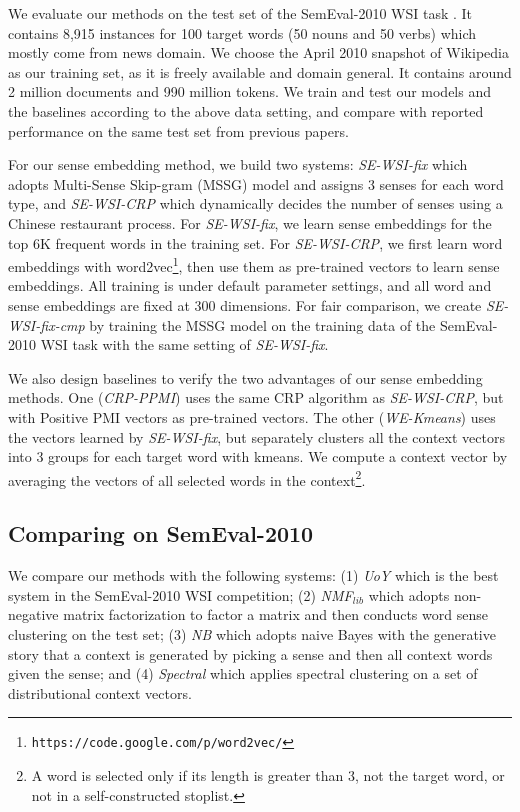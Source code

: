 \documentclass[11pt]{article}
\begin{document}
We evaluate our methods on the test set of the SemEval-2010 WSI task \cite{manandhar2010semeval}.
It contains 8,915 instances for 100 target words (50 nouns and 50 verbs) which mostly come from news domain.
We choose the April 2010 snapshot of Wikipedia \cite{wiki2010} as our training set, as it is freely available and domain general.
It contains around 2 million documents and 990 million tokens.
We train and test our models and the baselines according to the above data setting, and compare with reported performance on the same test set from previous papers.


For our sense embedding method, we build two systems: 
\emph{SE-WSI-fix} which adopts Multi-Sense Skip-gram (MSSG) model \cite{neelakantan-EtAl:2014:EMNLP2014} and assigns 3 senses for each word type,
and \emph{SE-WSI-CRP} \cite{li-jurafsky:2015:EMNLP} which dynamically decides the number of senses using a Chinese restaurant process.
For \emph{SE-WSI-fix}, we learn sense embeddings for the top 6K frequent words in the training set. For \emph{SE-WSI-CRP}, we first learn word embeddings with word2vec\footnote{\texttt{https://code.google.com/p/word2vec/}}, 
then use them as pre-trained vectors to learn sense embeddings.
All training is under default parameter settings, and all word and sense embeddings are fixed at 300 dimensions.
For fair comparison, we create \emph{SE-WSI-fix-cmp} by training the MSSG model on the training data of the SemEval-2010 WSI task with the same setting of \emph{SE-WSI-fix}.

We also design baselines to verify the two advantages of our sense embedding methods.
One (\emph{CRP-PPMI}) uses the same CRP algorithm as \emph{SE-WSI-CRP}, but with Positive PMI vectors as pre-trained vectors.
The other (\emph{WE-Kmeans}) uses the vectors learned by \emph{SE-WSI-fix}, but separately clusters all the context vectors into 3 groups for each target word with kmeans.
We compute a context vector by averaging the vectors of all selected words in the context\footnote{A word is selected only if its length is greater than 3, not the target word, or not in a self-constructed stoplist.}.

\subsection{Comparing on SemEval-2010}

We compare our methods with the following systems: (1) 
\emph{UoY} \cite{korkontzelos-manandhar:2010:SemEval} which is the best system in the SemEval-2010 WSI competition;
(2) \emph{NMF$_{lib}$} \cite{vandecruys-apidianaki:2011:ACL-HLT2011} which adopts non-negative matrix factorization to factor a matrix and then conducts word sense clustering on the test set; 
(3) \emph{NB} \cite{choe-charniak:2013:EMNLP} which adopts naive Bayes with the generative story that a context is generated by picking a sense and then all context words given the sense; 
and (4) \emph{Spectral} \cite{goyal2014unsupervised} which applies spectral clustering on a set of distributional context vectors.
\end{document}
